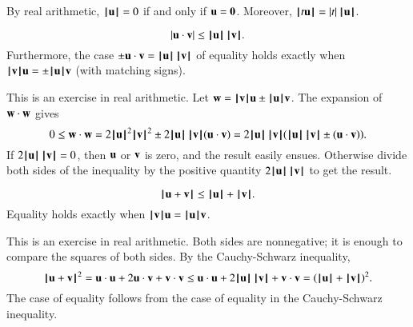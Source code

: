 By  real arithmetic,
$\normo{\u}=0$  if and only if $\u=\orz$.  Moreover,
$\normo{ t \u } = |t| \, \normo{\u}$.   



\begin{lemma}
  \[ |\u \cdot \v| \le
    \normo{\u}\,\normo{\v}.\]  Furthermore, the case
  $\pm \u\cdot \v = \normo{\u}\,\normo{\v}$ of equality holds exactly
  when $\normo{\v} \u = \pm\normo{\u} \v$ (with matching signs).
\end{lemma}
%

\begin{proved}
  This is an exercise in real arithmetic.  Let $\w = \normo{\v} \u \pm
  \normo{\u} \v$.  The expansion of $\w\cdot \w$ gives
  \[ 0\le \w\cdot \w = 2\normo{\u}^2\normo{\v}^2 \pm
    2\normo{\u}\, \normo{\v} (\u\cdot \v) = 2\normo{\u}\, \normo{\v}
    (\normo{\u}\, \normo{\v} \pm (\u \cdot \v)).\]  If
  $2\normo{\u} \,\normo{\v} = 0$, then $\u$ or $\v$ is zero, and the
  result easily ensues.  Otherwise divide both sides of the
  inequality by the positive quantity $2 \normo{\u} \,\normo{\v}$ to
  get the result.  \swallowed\end{proved}

\begin{lemma}
\label{lemma:triangle-ineq}
\[ 
\normo{\u + \v} \le \normo{\u} + \normo{\v }.
\] 
Equality holds exactly when $\normo{\v}\u = \normo{\u}\v$.
\end{lemma}
%

\begin{proved}  This is an exercise in real arithmetic.
Both sides are nonnegative; it is enough to compare the squares of
both sides.  By the Cauchy-Schwarz inequality,
\[ \normo{\u + \v}^2 = \u\cdot \u + 2 \u\cdot \v + \v\cdot \v \le
  \u\cdot \u + 2 \normo{ \u}\,\normo{\v} + \v\cdot \v = (\normo{\u}+\normo{\v})^2.
\] 
The case of equality follows from the case of equality in the
Cauchy-Schwarz inequality.
\swallowed\end{proved}



